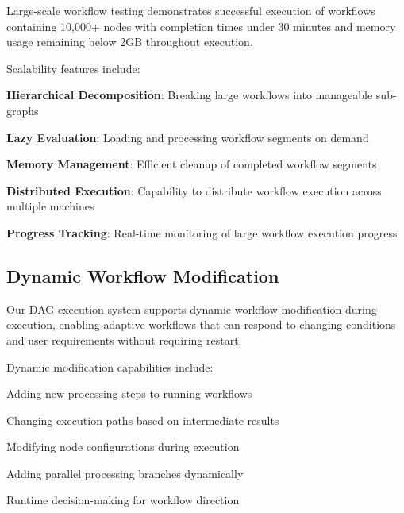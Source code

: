 \begin{successbox}
Large-scale workflow testing demonstrates successful execution of workflows containing 10,000+ nodes with completion times under 30 minutes and memory usage remaining below 2GB throughout execution.
\end{successbox}

Scalability features include:

\begin{expandedlist}
    \item \textbf{Hierarchical Decomposition}: Breaking large workflows into manageable sub-graphs
    \item \textbf{Lazy Evaluation}: Loading and processing workflow segments on demand
    \item \textbf{Memory Management}: Efficient cleanup of completed workflow segments
    \item \textbf{Distributed Execution}: Capability to distribute workflow execution across multiple machines
    \item \textbf{Progress Tracking}: Real-time monitoring of large workflow execution progress
\end{expandedlist}

\subsection*{Dynamic Workflow Modification}

Our DAG execution system supports dynamic workflow modification during execution, enabling adaptive workflows that can respond to changing conditions and user requirements without requiring restart.

Dynamic modification capabilities include:

\begin{description}[leftmargin=4cm,labelwidth=3.5cm]
    \item[\textbf{Node Addition}] Adding new processing steps to running workflows
    \item[\textbf{Path Modification}] Changing execution paths based on intermediate results
    \item[\textbf{Parameter Updates}] Modifying node configurations during execution
    \item[\textbf{Branch Insertion}] Adding parallel processing branches dynamically
    \item[\textbf{Conditional Routing}] Runtime decision-making for workflow direction
\end{description}

